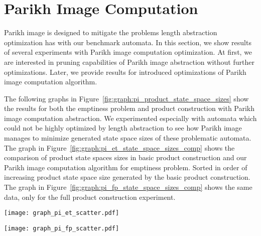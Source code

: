 \section{Parikh Image Computation}

Parikh image is designed to mitigate the problems length abstraction optimization has with our benchmark automata. In this section, we show results of several experiments with Parikh image computation optimization. At first, we are interested in pruning capabilities of Parikh image abstraction without further optimizations. Later, we provide results for introduced optimizations of Parikh image computation algorithm.

The following graphs in Figure~\ref{fig:graph:pi_product_state_space_sizes} show the results for both the emptiness problem and product construction with Parikh image computation abstraction. We experimented especially with automata which could not be highly optimized by length abstraction to see how Parikh image manages to minimize generated state space sizes of these problematic automata. The graph in Figure~\ref{fig:graph:pi_et_state_space_sizes_comp} shows the comparison of product state spaces sizes in basic product construction and our Parikh image computation algorithm for emptiness problem. Sorted in order of increasing product state space size generated by the basic product construction. The graph in Figure~\ref{fig:graph:pi_fp_state_space_sizes_comp} shows the same data, only for the full product construction experiment.

\begin{figure*}[ht]
    \centering
    \begin{minipage}{0.49\linewidth}
        \centering
        \texttt{[image: graph\_pi\_et\_scatter.pdf]}
        \caption{Emptiness problem.}
        \label{fig:graph:pi_et_state_space_sizes_comp}
    \end{minipage}
    \hfill
    \begin{minipage}{0.49\linewidth}
        \centering
        \texttt{[image: graph\_pi\_fp\_scatter.pdf]}
        \caption{Product construction.}
        \label{fig:graph:pi_fp_state_space_sizes_comp}
    \end{minipage}
    \vspace{0.5cm}
    \caption{Comparison of state space sizes generated by basic and optimized product construction with length abstraction (blue dots) and Parikh image computation (orange dots). Both axes are in symmetrical logarithmic scale\protect\footnotemark, showing state space sizes: x-axis of basic product, y-axis of optimized product.}
    \label{fig:graph:pi_product_state_space_sizes}
\end{figure*}

